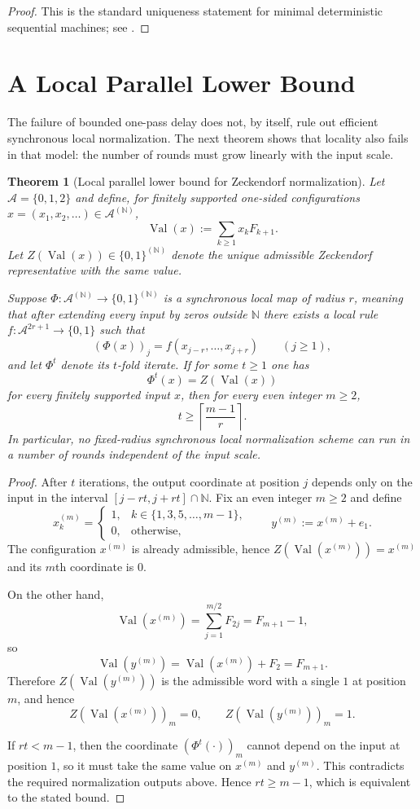 \documentclass[11pt,letterpaper]{article}
\numberwithin{equation}{section}
\theoremstyle{plain}
\newtheorem{theorem}{Theorem}[section]
\theoremstyle{definition}
\theoremstyle{remark}
\newcommand{\A}{\mathcal{A}}
\newcommand{\NN}{\mathbb{N}}
\DeclareMathOperator{\Val}{Val}
\begin{document}
\begin{proof}
This is the standard uniqueness statement for minimal deterministic sequential
machines; see \cite{BerstelReutenauer1988RationalSeries}.
\end{proof}

\section{A Local Parallel Lower Bound}\label{sec:complexity}

The failure of bounded one-pass delay does not, by itself, rule out efficient
synchronous local normalization.  The next theorem shows that locality also
fails in that model: the number of rounds must grow linearly with the input
scale.

\begin{theorem}[Local parallel lower bound for Zeckendorf normalization]\label{thm:zeckendorf-parallel-propagation-lower-bound}
Let $\A=\{0,1,2\}$ and define, for finitely supported one-sided configurations
$x=(x_1,x_2,\ldots)\in\A^{(\NN)}$,
\[
\Val(x):=\sum_{k\ge 1} x_kF_{k+1}.
\]
Let $Z(\Val(x))\in\{0,1\}^{(\NN)}$ denote the unique admissible Zeckendorf
representative with the same value.

Suppose $\Phi:\A^{(\NN)}\to\{0,1\}^{(\NN)}$ is a synchronous local map of
radius $r$, meaning that after extending every input by zeros outside $\NN$
there exists a local rule $f:\A^{2r+1}\to\{0,1\}$ such that
\[
(\Phi(x))_j=f(x_{j-r},\dots,x_{j+r})
\qquad (j\ge 1),
\]
and let $\Phi^t$ denote its $t$-fold iterate.  If for some $t\ge 1$ one has
\[
\Phi^t(x)=Z(\Val(x))
\]
for every finitely supported input $x$, then for every even integer $m\ge 2$,
\[
t\ge \left\lceil \frac{m-1}{r}\right\rceil.
\]
In particular, no fixed-radius synchronous local normalization scheme can run
in a number of rounds independent of the input scale.
\end{theorem}

\begin{proof}
After $t$ iterations, the output coordinate at position $j$ depends only on
the input in the interval $[j-rt,j+rt]\cap\NN$.
Fix an even integer $m\ge 2$ and define
\[
x^{(m)}_k=
\begin{cases}
1,&k\in\{1,3,5,\dots,m-1\},\\
0,&\text{otherwise},
\end{cases}
\qquad
y^{(m)}:=x^{(m)}+e_1.
\]
The configuration $x^{(m)}$ is already admissible, hence
$Z(\Val(x^{(m)}))=x^{(m)}$ and its $m$th coordinate is $0$.

On the other hand,
\[
\Val(x^{(m)})
=
\sum_{j=1}^{m/2}F_{2j}
=
F_{m+1}-1,
\]
so
\[
\Val(y^{(m)})=\Val(x^{(m)})+F_2=F_{m+1}.
\]
Therefore $Z(\Val(y^{(m)}))$ is the admissible word with a single $1$ at
position $m$, and hence
\[
Z(\Val(x^{(m)}))_m=0,
\qquad
Z(\Val(y^{(m)}))_m=1.
\]

If $rt<m-1$, then the coordinate $(\Phi^t(\cdot))_m$ cannot depend on the input
at position $1$, so it must take the same value on $x^{(m)}$ and $y^{(m)}$.
This contradicts the required normalization outputs above.  Hence
$rt\ge m-1$, which is equivalent to the stated bound.
\end{proof}
\end{document}
